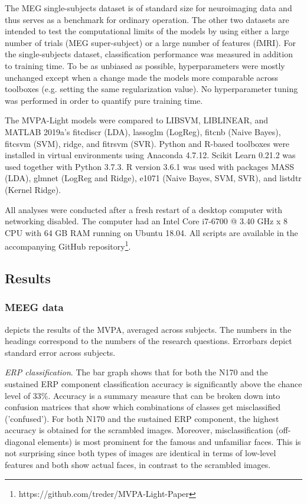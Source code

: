 \documentclass[utf8]{frontiersSCNS} %
\begin{document}
The MEG single-subjects dataset is of standard size for neuroimaging data and thus serves as a benchmark for ordinary operation. The other two datasets are intended to test the computational limits of the models by using either a large number of trials (MEG super-subject) or a large number of features (fMRI). For the single-subjects dataset, classification performance was measured in addition to training time.
To be as unbiased as possible, hyperparameters were mostly unchanged except when a change made the models more comparable across toolboxes (e.g. setting the same regularization value). No hyperparameter tuning was performed in order to quantify pure training time.

The MVPA-Light models were compared to LIBSVM,  LIBLINEAR, and MATLAB 2019a's fitcdiscr (LDA), lassoglm (LogReg), fitcnb (Naive Bayes), fitcsvm (SVM), ridge, and fitrsvm (SVR). Python and R-based toolboxes were installed in virtual environments using Anaconda 4.7.12. Scikit Learn 0.21.2 was used together with Python 3.7.3. R version 3.6.1 was used with packages MASS (LDA), glmnet (LogReg and Ridge), e1071 (Naive Bayes, SVM, SVR), and listdtr (Kernel Ridge).

All analyses were conducted after a fresh restart of a desktop computer with networking disabled. The computer had an Intel Core i7-6700 @ 3.40 GHz x 8 CPU with 64 GB RAM running on Ubuntu 18.04. All scripts are available in the accompanying GitHub repository\footnote{https://github.com/treder/MVPA-Light-Paper}.

\subsection{Results}

\subsubsection{MEEG data}
 depicts the results of the MVPA, averaged across subjects. The numbers in the headings correspond to the numbers of the research questions. Errorbars depict standard error across subjects.

\textit{ERP classification}. The bar graph shows that for both the N170 and the sustained ERP component classification accuracy is significantly above the chance level of 33\%. Accuracy is a summary measure that can be broken down into confusion matrices that show which combinations of classes get misclassified ('confused'). For both N170 and the sustained ERP component, the highest accuracy is obtained for the scrambled images. Moreover,  misclassification (off-diagonal elements) is most prominent for the famous and unfamiliar faces. This is not surprising since both types of images are identical in terms of low-level features and both show actual faces, in contrast to the scrambled images.
\end{document}
